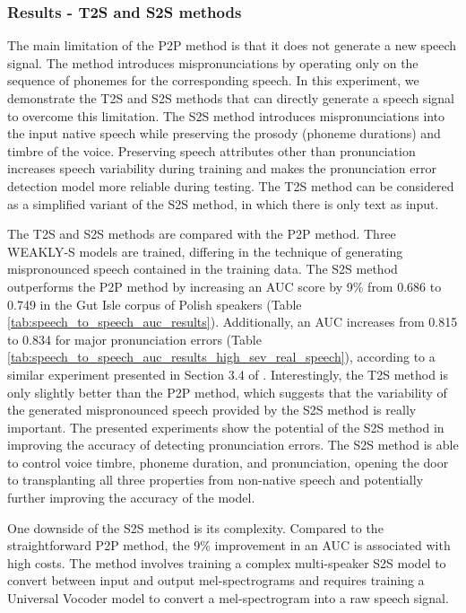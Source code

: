\documentclass[]{interact}
\theoremstyle{plain}%
\theoremstyle{definition}
\theoremstyle{remark}
\begin{document}
\subsubsection{Results - T2S and S2S methods}
\label{sec:s2s_experiment}
The main limitation of the P2P method is that it does not generate a new speech signal. The method introduces mispronunciations by operating only on the sequence of phonemes for the corresponding speech. In this experiment, we demonstrate the T2S and S2S methods that can directly generate a speech signal to overcome this limitation. The S2S method introduces mispronunciations into the input native speech while preserving the prosody (phoneme durations) and timbre of the voice. Preserving speech attributes other than pronunciation increases speech variability during training and makes the pronunciation error detection model more reliable during testing. The T2S method can be considered as a simplified variant of the S2S method, in which there is only text as input. 

The T2S and S2S methods are compared with the P2P method. Three WEAKLY-S models are trained, differing in the technique of generating mispronounced speech contained in the training data. The S2S method outperforms the P2P method by increasing an AUC score by 9\% from 0.686 to 0.749 in the Gut Isle corpus of Polish speakers (Table \ref{tab:speech_to_speech_auc_results}). Additionally, an AUC increases from 0.815 to 0.834 for major pronunciation errors (Table \ref{tab:speech_to_speech_auc_results_high_sev_real_speech}), according to a similar experiment presented in Section 3.4 of \cite{korzekwa21b_interspeech}. Interestingly, the T2S method is only slightly better than the P2P method, which suggests that the variability of the generated mispronounced speech provided by the S2S method is really important. The presented experiments show the potential of the S2S method in improving the accuracy of detecting pronunciation errors. The S2S method is able to control voice timbre, phoneme duration, and pronunciation, opening the door to transplanting all three properties from non-native speech and potentially further improving the accuracy of the model. 

One downside of the S2S method is its complexity. Compared to the straightforward P2P method, the 9\% improvement in an AUC is associated with high costs. The method involves training a complex multi-speaker S2S model to convert between input and output mel-spectrograms and requires training a Universal Vocoder model to convert a mel-spectrogram into a raw speech signal. 
\end{document}
